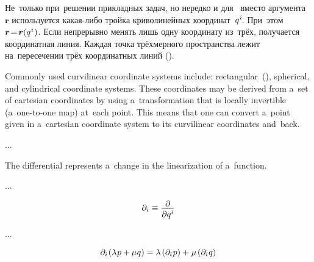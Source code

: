 \begin{otherlanguage}{russian}

Не~только при~решении прикладных задач, но нередко и для~ вместо аргумента~$\bm{r}$ ис\-поль\-зу\-ет\-ся какая-либо трой\-ка криво\-линей\-ных координат~${q^{\hspace{.1ex}i}\hspace{-0.2ex}}$. При~этом ${\bm{r} \!=\! \bm{r}(q^{\hspace{.1ex}i}\hspace{.1ex})}$. Если непрерывно менять лишь одну координату из~трёх, получается координатная линия. Каждая точка трёхмерного пространства лежит на~пересечении трёх координатных линий ().

Commonly used curvilinear coordinate systems include: rectangular~(), spherical, and cylindrical coordinate systems. These coordinates may be derived from a~set of cartesian coordinates by using a~transformation that is locally invertible (a~one-to-one map) at~each point. This means that one can convert a~point given in a~cartesian coordinate system to its curvilinear coordinates and~back.

...

The differential represents a~change in the linearization of a~function.

...

\nopagebreak\vspace{-0.1em}\begin{equation*}
\partial_i \equiv \frac{\raisebox{-0.2em}{$\partial$}}{\raisebox{-0.1em}{$\partial q^i$}}
\end{equation*}

...


\nopagebreak\vspace{-0.4em}\begin{equation}\label{linearityordifferentiation}
\partial_i \hspace{-0.2ex} \left( \lambda \hspace{.1ex} p + \hspace{-0.1ex} \mu \hspace{.1ex} q \right)
= \lambda \hspace{-0.1ex} \left( \partial_i \hspace{.1ex} p \right) + \hspace{.1ex}
\mu \hspace{-0.1ex} \left( \partial_i \hspace{.1ex} q \right)
\end{equation}


\end{otherlanguage}
